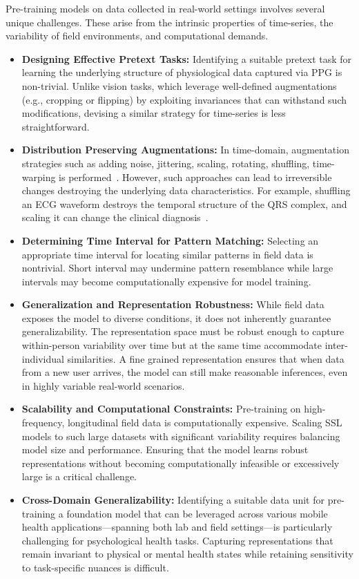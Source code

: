 Pre-training models on data collected in real-world settings involves several unique challenges. These arise from the intrinsic properties of time-series, the variability of field environments, and computational demands.
\begin{itemize}
    \item\textbf{Designing Effective Pretext Tasks:}
    Identifying a suitable pretext task for learning the underlying structure of physiological data captured via PPG is non-trivial. Unlike vision tasks, which leverage well-defined augmentations (e.g., cropping or flipping) by exploiting invariances that can withstand such modifications, devising a similar strategy for time-series is less straightforward. 

    \item\textbf{Distribution Preserving Augmentations:} In time-domain, augmentation strategies such as adding noise, jittering, scaling, rotating, shuffling, time-warping is performed~\cite{um2017data}. However, such approaches can lead to irreversible changes destroying the underlying data characteristics. For example, shuffling an ECG waveform destroys the temporal structure of the QRS complex, and scaling it can change the clinical diagnosis~\cite{nault2009clinical}. 

    \item\textbf{Determining Time Interval for Pattern Matching:} 
    Selecting an appropriate time interval for locating similar patterns in field data is nontrivial. Short interval may undermine pattern resemblance while large intervals may become computationally expensive for model training. 
    
    \item\textbf{Generalization and Representation Robustness:} While field data exposes the model to diverse conditions, it does not inherently guarantee generalizability. The representation space must be robust enough to capture within-person variability over time but at the same time accommodate inter-individual similarities. A fine grained representation ensures that when data from a new user arrives, the model can still make reasonable inferences, even in highly variable real-world scenarios.

    \item\textbf{Scalability and Computational Constraints:} Pre-training on high-frequency, longitudinal field data is computationally expensive. Scaling SSL models to such large datasets with significant variability requires balancing model size and performance. Ensuring that the model learns robust representations without becoming computationally infeasible or excessively large is a critical challenge.

    \item\textbf{Cross-Domain Generalizability:} Identifying a suitable data unit for pre-training a foundation model that can be leveraged across various mobile health applications—spanning both lab and field settings—is particularly challenging for psychological health tasks. Capturing representations that remain invariant to physical or mental health states while retaining sensitivity to task-specific nuances is difficult.  
    
\end{itemize}
 
